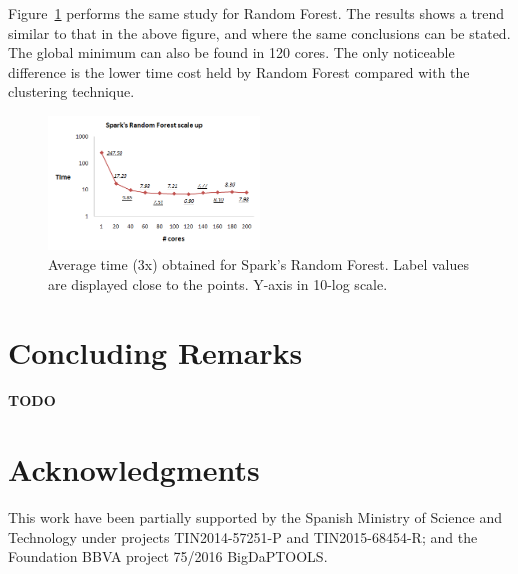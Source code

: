 \documentclass[3p,review]{elsarticle}
\newcommand{\TODO}{\textbf{TODO}}
\begin{document}
Figure~\ref{fig:rf-spark} performs the same study for Random Forest. The results shows a trend similar to that in the above figure, and where the same conclusions can be stated. The global minimum can also be found in 120 cores. The only noticeable difference is the lower time cost held by Random Forest compared with the clustering technique.

\begin{figure}[htp]
    \centering
    \includegraphics[width=0.5\textwidth]{rf-spark}
    \caption{Average time (3x) obtained for Spark's Random Forest. Label values are displayed close to the points. Y-axis in 10-log scale.}
    \label{fig:rf-spark}
\end{figure}

\section{Concluding Remarks}\label{sec:conclusions}

\TODO

\section*{Acknowledgments}\label{sec:ack}

This work have been partially supported by the Spanish Ministry of Science and Technology under projects TIN2014-57251-P and TIN2015-68454-R; and the Foundation BBVA project 75/2016 BigDaPTOOLS.




\end{document}
